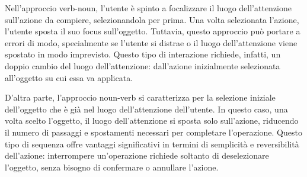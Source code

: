 Nell'approccio verb-noun, l'utente è spinto a focalizzare il luogo dell'attenzione sull'azione da compiere, selezionandola per prima. Una volta selezionata l’azione, l'utente sposta il suo focus sull'oggetto. Tuttavia, questo approccio può portare a errori di modo, specialmente se l'utente si distrae o il luogo dell’attenzione viene spostato in modo imprevisto. Questo tipo di interazione richiede, infatti, un doppio cambio del luogo dell'attenzione: dall'azione inizialmente selezionata all'oggetto su cui essa va applicata.

D'altra parte, l'approccio noun-verb si caratterizza per la selezione iniziale dell'oggetto che è già nel luogo dell'attenzione dell'utente. In questo caso, una volta scelto l'oggetto, il luogo dell'attenzione si sposta solo sull'azione, riducendo il numero di passaggi e spostamenti necessari per completare l’operazione. Questo tipo di sequenza offre vantaggi significativi in termini di semplicità e reversibilità dell'azione: interrompere un'operazione richiede soltanto di deselezionare l’oggetto, senza bisogno di confermare o annullare l'azione.

